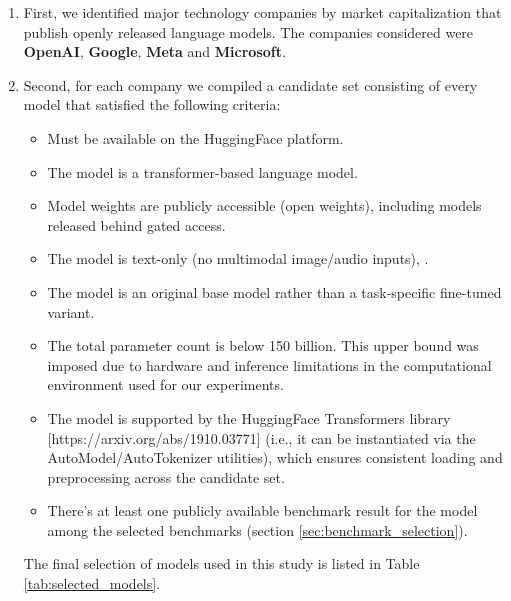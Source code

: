 \begin{enumerate}
    \item First, we identified major technology companies by market capitalization that publish openly released language models. The companies considered were \textbf{OpenAI}, \textbf{Google}, \textbf{Meta} and \textbf{Microsoft}.
    \item Second, for each company we compiled a candidate set consisting of every model that satisfied the following criteria:
    
        \begin{itemize}
            \item Must be available on the HuggingFace platform.
            \item The model is a transformer-based language model.
            \item Model weights are publicly accessible (open weights), including models released behind
            gated access.
            \item The model is text-only (no multimodal image/audio inputs), .
            \item The model is an original base model rather than a task-specific fine-tuned variant.
            \item The total parameter count is below 150 billion. This upper bound was imposed due to
            hardware and inference limitations in the computational environment used for our experiments.
            \item The model is supported by the HuggingFace Transformers library [https://arxiv.org/abs/1910.03771] (i.e., it can be
            instantiated via the AutoModel/AutoTokenizer utilities), which ensures consistent loading and
            preprocessing across the candidate set.
            \item There's at least one publicly available benchmark result for the model among the selected benchmarks (section \ref{sec:benchmark_selection}).
        \end{itemize}

        The final selection of models used in this study is listed in Table \ref{tab:selected_models}.


\end{enumerate}
